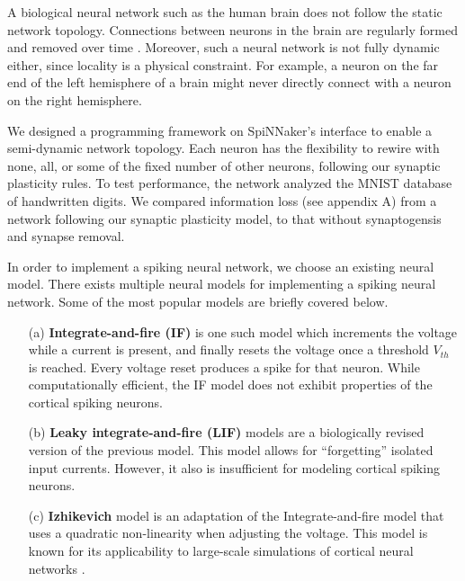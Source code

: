 \documentclass[journal]{./sty/IEEEtran}
\begin{document}
A biological neural network such as the human brain does not follow the static network topology. 
Connections between neurons in the brain are regularly formed and removed over time \cite{SynGen:Levy, StatDepRed:Levy}. 
Moreover, such a neural network is not fully dynamic either, since locality is a physical constraint. 
For example, a neuron on the far end of the left hemisphere of a brain might never directly connect with a neuron on the right hemisphere.

We designed a programming framework on SpiNNaker's interface to enable a semi-dynamic network topology.
Each neuron has the flexibility to rewire with none, all, or some of the fixed number of other neurons, following our synaptic plasticity rules.
To test performance, the network analyzed the MNIST database of handwritten digits. We compared information loss (see appendix A) from a network following our synaptic plasticity model, to that without synaptogensis and synapse removal.


In order to implement a spiking neural network, we choose an existing neural model.
There exists multiple neural models for implementing a spiking neural network. 
Some of the most popular models are briefly covered below.
 
\begin{itemize}
\item[(a)] {\bf Integrate-and-fire (IF)} 
 is one such model which increments the voltage while a current is present,
and finally resets the voltage once a threshold $V_{th}$ is reached. 
Every voltage reset produces a spike for that neuron.
While computationally efficient, the IF model does not exhibit properties of the cortical spiking neurons.
\item[(b)] {\bf Leaky integrate-and-fire (LIF)} 
 models are a biologically revised version of the previous model.
This model allows for ``forgetting'' isolated input currents.
However, it also is insufficient for modeling cortical spiking neurons.
\item[(c)] {\bf Izhikevich} 
 model is an adaptation of the Integrate-and-fire model that uses a quadratic non-linearity when adjusting the voltage.
This model is known for its applicability to large-scale simulations of cortical neural networks \cite{Spikes:Izhi, Polychron:Izhi}.
\end{itemize}
\end{document}
